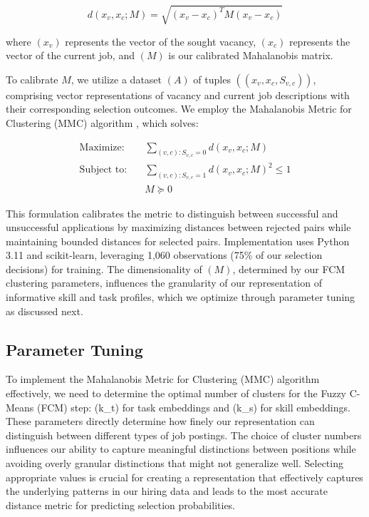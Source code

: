 \begin{equation}
d(x_v, x_c; M) = \sqrt{(x_v - x_c)^T M (x_v - x_c)}
\end{equation}

where $(x_v)$ represents the vector of the sought vacancy, $(x_c)$ represents the vector of the current job, 
and $(M)$ is our calibrated Mahalanobis matrix.

To calibrate $M$, we utilize a dataset $(A)$ of tuples $((x_v, x_c, S_{v,c}))$, comprising vector representations 
of vacancy and current job descriptions with their corresponding selection outcomes. We employ the Mahalanobis 
Metric for Clustering (MMC) algorithm \citep{Xing2002}, which solves:

\begin{align*}
\text{Maximize:} \quad & \sum_{(v,c): S_{v,c} = 0} d(x_v, x_c; M) \\[1em]
\text{Subject to:} \quad & \sum_{(v,c): S_{v,c} = 1} d(x_v, x_c; M)^2 \leq 1 \\
& M \succeq 0
\end{align*}

This formulation calibrates the metric to distinguish between successful and unsuccessful applications by 
maximizing distances between rejected pairs while maintaining bounded distances for selected pairs. Implementation 
uses Python 3.11 and scikit-learn, leveraging 1,060 observations (75\% of our selection decisions) for training. 
The dimensionality of $(M)$, determined by our FCM clustering parameters, influences the granularity of our 
representation of informative skill and task profiles, which we optimize through parameter tuning as discussed next.


\subsection{Parameter Tuning}

To implement the Mahalanobis Metric for Clustering (MMC) algorithm effectively, we need to determine the 
optimal number of clusters for the Fuzzy C-Means (FCM) step: (k_t) for task embeddings and (k_s) for skill 
embeddings. These parameters directly determine how finely our representation can distinguish between 
different types of job postings. The choice of cluster numbers influences our ability to capture meaningful 
distinctions between positions while avoiding overly granular distinctions that might not generalize well. 
Selecting appropriate values is crucial for creating a representation that effectively captures the 
underlying patterns in our hiring data and leads to the most accurate distance metric for predicting 
selection probabilities.


